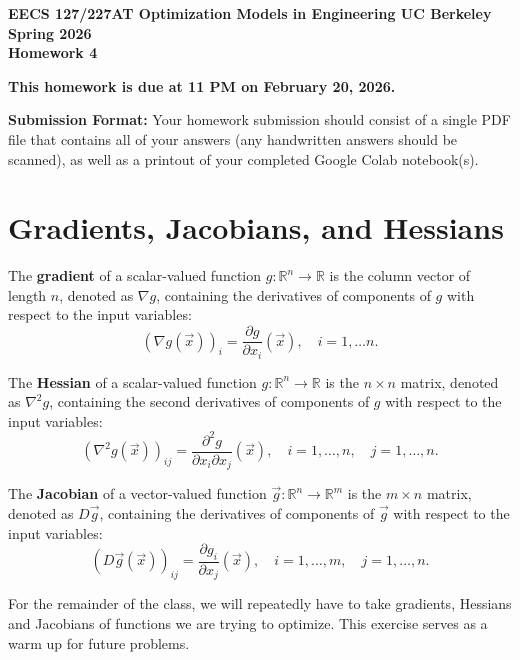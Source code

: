 \documentclass[10pt]{article}
\theoremstyle{definition}
\theoremstyle{plain}
\newcommand{\RR}{\mathbb{R}}
\begin{document}
\begin{center}
{\large\bfseries EECS 127/227AT \quad Optimization Models in Engineering \quad UC Berkeley \quad Spring 2026}\\[6pt]
{\LARGE\bfseries Homework 4}
\end{center}

\medskip

\textbf{This homework is due at 11 PM on February 20, 2026.}

\textbf{Submission Format:} Your homework submission should consist of a single PDF file that contains all of your answers (any handwritten answers should be scanned), as well as a printout of your completed Google Colab notebook(s).

\section{Gradients, Jacobians, and Hessians}

The \textbf{gradient} of a scalar-valued function $g\colon \RR^n \to \RR$ is the column vector of length $n$, denoted as $\nabla g$, containing the derivatives of components of $g$ with respect to the input variables:
\begin{equation}
(\nabla g(\vec{x}))_i = \frac{\partial g}{\partial x_i}(\vec{x}), \quad i = 1, \ldots n.
\end{equation}

The \textbf{Hessian} of a scalar-valued function $g\colon \RR^n \to \RR$ is the $n \times n$ matrix, denoted as $\nabla^2 g$, containing the second derivatives of components of $g$ with respect to the input variables:
\begin{equation}
(\nabla^2 g(\vec{x}))_{ij} = \frac{\partial^2 g}{\partial x_i \partial x_j}(\vec{x}), \quad i = 1, \ldots, n, \quad j = 1, \ldots, n.
\end{equation}

The \textbf{Jacobian} of a vector-valued function $\vec{g}\colon \RR^n \to \RR^m$ is the $m \times n$ matrix, denoted as $D\vec{g}$, containing the derivatives of components of $\vec{g}$ with respect to the input variables:
\begin{equation}
(D\vec{g}(\vec{x}))_{ij} = \frac{\partial g_i}{\partial x_j}(\vec{x}), \quad i = 1, \ldots, m, \quad j = 1, \ldots, n.
\end{equation}

For the remainder of the class, we will repeatedly have to take gradients, Hessians and Jacobians of functions we are trying to optimize. This exercise serves as a warm up for future problems.
\end{document}

